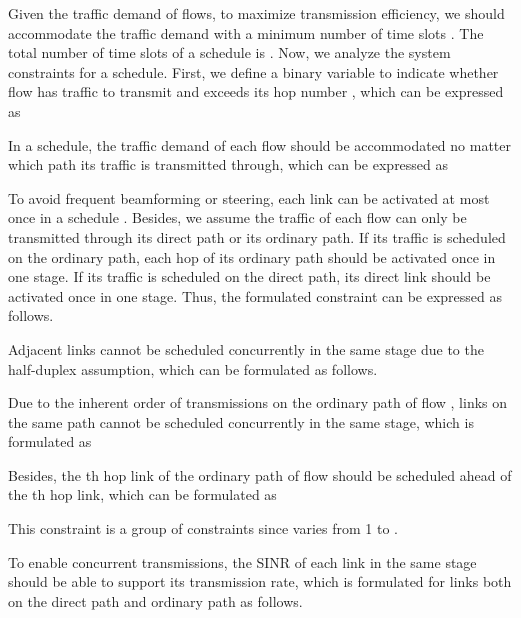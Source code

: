 \documentclass[journal]{IEEEtran}
\begin{document}
Given the traffic demand of flows, to maximize transmission efficiency, we should accommodate the
traffic demand with a minimum number of time slots \cite{mao}. The total number of time slots of a schedule is
. Now, we analyze the system constraints for a schedule.
First, we define a binary variable  to indicate whether flow  has traffic to transmit
and  exceeds its hop number , which can be expressed as


In a schedule, the traffic demand of each flow  should be accommodated no matter which path its
traffic is transmitted through, which can be expressed as



To avoid frequent beamforming or steering, each link can be activated at most once in a schedule
\cite{mao}. Besides, we assume the traffic of each flow can only be transmitted through its direct
path or its ordinary path. If its traffic is scheduled on the ordinary path, each hop of its
ordinary path should be activated once in one stage. If its traffic is scheduled on the direct
path, its direct link should be activated once in one stage. Thus, the formulated constraint can be
expressed as follows.



Adjacent links cannot be scheduled concurrently in the same stage due to the half-duplex
assumption, which can be formulated as follows.






Due to the inherent order of transmissions on the ordinary path of flow , links on the same path
cannot be scheduled concurrently in the same stage, which is formulated as

Besides, the th hop link of the ordinary path of flow  should be scheduled ahead of the
th hop link, which can be formulated as

This constraint is a group of constraints since  varies from 1 to .

To enable concurrent transmissions, the SINR of each link in the same stage should be able to
support its transmission rate, which is formulated for links both on the direct path and ordinary
path as follows.
\end{document}
